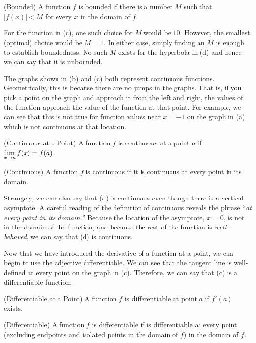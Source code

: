  (Bounded) A function $f$ is bounded if there is a
number $M$ such that $|f(x)| < M$ for every $x$ in the domain of $f$.
\enddef

For the function in (c), one such choice for $M$ would be $10$.  However,
the smallest (optimal) choice would be $M=1$.  In either case, simply
finding an $M$ is enough to establish boundedness.  No such $M$ exists for
the hyperbola in (d) and hence we can say that it is 
{\dfont unbounded}.  

  The graphs shown in (b) and (c) both represent
{\dfont continuous} functions.  Geometrically, this is because there are no
jumps in the graphs.  That is, if you pick a point on the graph and
approach it from the left and right, the values of the function approach
the value of the function at that point.  For example, we can see that this
is not true for function values near $x=-1$ on the graph in (a) which is
not continuous at that location.  

 (Continuous at a Point) A function $f$ is continuous
at a point $a$ if $\displaystyle \lim_{x\to a} f(x) = f(a)$.  
\enddef
{}

 (Continuous) A function $f$ is continuous if it is
continuous at every point in its domain.
\enddef

Strangely, we can also say that (d) is continuous even though there is a
vertical asymptote.  A careful reading of the definition of continuous
reveals the phrase ``{\em at every point in its domain.}''  Because the
location of the asymptote, $x=0$, is not in the domain of the function, and
because the rest of the function is {\em well-behaved}, we can say that (d)
is continuous.

 Now that we have introduced the derivative
of a function at a point, we can begin to use the adjective {\dfont
differentiable}.  
We can see that the tangent line is well-defined at every
point on the graph in (c).  Therefore, we can say that (c) is a
differentiable function.

 (Differentiable at a Point) A function $f$ is
differentiable at point $a$ if $f'(a)$ exists.
\enddef

 (Differentiable) A function $f$ is differentiable if is
differentiable at every point (excluding endpoints and isolated points in the
domain of $f$) in the domain of $f$.
\enddef

